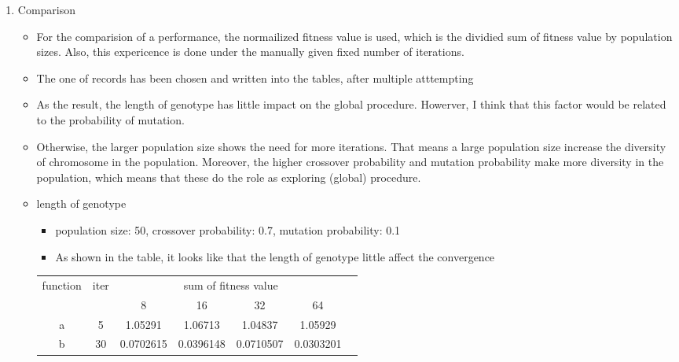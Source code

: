\documentclass{standalone}
\begin{document}
\begin{enumerate}
  \item Comparison
  \begin{itemize}
    \item For the comparision of a performance, the normailized fitness value is used, which is the dividied sum of fitness value by population sizes. Also, this expericence is done under the manually given fixed number of iterations.
    \item The one of records has been chosen and written into the tables, after multiple atttempting
    \item As the result, the length of genotype has little impact on the global procedure. Howerver, I think that this factor would be related to the probability of mutation.
    \item Otherwise, the larger population size shows the need for more iterations. That means a large population size increase the diversity of chromosome in the population. Moreover, the higher crossover probability and mutation probability make more diversity in the population, which means that these do the role as exploring (global) procedure.
    \item length of genotype
    \begin{itemize}
      \item population size: 50, crossover probability: 0.7, mutation probability: 0.1
      \item As shown in the table, it looks like that the length of genotype little affect the convergence
    \end{itemize}
    \begin{table}[!h]
    \begin{center}
      \begin{tabular}{| c | c | c | c  | c | c | c } \hline
      \multirow{2}{*}{function} & \multirow{2}{*}{iter} & \multicolumn{4}{c|}{sum of fitness value} \\ \cline{3-6}
                                &                       & 8         & 16        & 32        & 64       \\ \hline
               a                &  5                    & 1.05291   & 1.06713   & 1.04837   & 1.05929 \\ \hline
               b                &  30                   & 0.0702615 & 0.0396148 & 0.0710507 & 0.0303201 \\ \hline

\end{tabular}
\end{center}
\end{table}
\end{itemize}
\end{enumerate}
\end{document}
